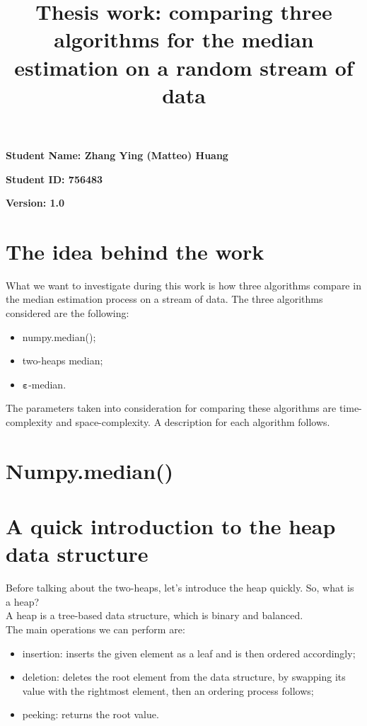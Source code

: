 \documentclass[paper=a4wide, fontsize=12pt]{scrartcl}	 %
\title{ \color{DarkRed}Thesis work: comparing three algorithms for the median estimation on a random stream of data\vspace{-1.5em}}
\date{} %
\begin{document}
\maketitle %
\thispagestyle{fancy} %


\vspace{-0.5cm} \textbf{Student Name: Zhang Ying (Matteo) Huang}

\textbf{Student ID: 756483}

\textbf{Version: 1.0}

\vspace{0.5cm}

\section*{The idea behind the work}
What we want to investigate during this work is how three algorithms compare in the median estimation process on a stream of data.
The three algorithms considered are the following:
\begin{itemize}
    \item numpy.median();
    \item two-heaps median;
    \item $\mathbf{\varepsilon}$-median.
\end{itemize}
The parameters taken into consideration for comparing these algorithms are time-complexity and space-complexity.
A description for each algorithm follows.


\section*{Numpy.median()}


\section*{A quick introduction to the heap data structure}
Before talking about the two-heaps, let's introduce the heap quickly.
So, what is a heap? \\ 
A heap is a tree-based data structure, which is binary and balanced. \\
The main operations we can perform are:
\begin{itemize}
    \item insertion: inserts the given element as a leaf and is then ordered accordingly;
    \item deletion: deletes the root element from the data structure, by swapping its value with the rightmost element, then an ordering process follows;
    \item peeking: returns the root value.
\end{itemize}
\end{document}
